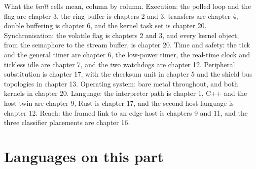 What the \emph{built} cells mean, column by column. Execution: the polled loop
and the flag are chapter 3, the ring buffer is chapters 2 and 3, transfers are
chapter 4, double buffering is chapter 6, and the kernel task set is chapter 20.
Synchronisation: the volatile flag is chapters 2 and 3, and every kernel object,
from the semaphore to the stream buffer, is chapter 20. Time and safety: the
tick and the general timer are chapter 6, the low-power timer, the real-time
clock and tickless idle are chapter 7, and the two watchdogs are chapter 12.
Peripheral substitution is chapter 17, with the checksum unit in chapter 5 and
the shield bus topologies in chapter 13. Operating system: bare metal
throughout, and both kernels in chapter 20. Language: the interpreter path is
chapter 1, C++ and the host twin are chapter 9, Rust is chapter 17, and the
second host language is chapter 12. Reach: the framed link to an edge host is
chapters 9 and 11, and the three classifier placements are chapter 16.

\section{Languages on this part}

